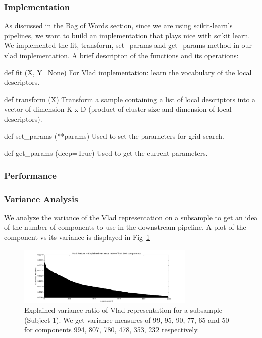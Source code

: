 \documentclass[final,leqno,onefignum,onetabnum]{siamltexmm}
\begin{document}
\subsubsection{Implementation}
As discussed in the Bag of Words section, since we are using scikit-learn's pipelines, we want to build an implementation that plays nice with scikit learn.  We implemented the fit, transform, set\_params and get\_params method in our vlad implementation.  A brief descripton of the functions and its operations:
\begin{description}
  \item{def fit (X, Y=None)}  For Vlad implementation: learn the vocabulary of the local descriptors.
  \item{def transform (X)}  Transform a sample containing a list of local descriptors into a vector of dimension K x D (product of cluster size and dimension of local descriptors).
  \item{def set\_params (**params)} Used to set the parameters for grid search.
  \item{def get\_params (deep=True)} Used to get the current parameters.
\end{description}

\subsubsection{Performance}

\subsubsection{Variance Analysis}
We analyze the variance of the Vlad representation on a subsample to get an idea of the number of components to use in the downstream pipeline.  A plot of the component vs its variance is displayed in Fig~\ref{fig:vlad_variance}
\begin{figure}
  \centering
  \includegraphics[width=0.75\textwidth]{images/vlad_variance}
  \caption{Explained variance ratio of Vlad representation for a subsample (Subject 1).  We get variance measures of 99, 95, 90, 77, 65 and 50 for components 994, 807, 780, 478, 353, 232 respectively.\label{fig:vlad_variance}} 
\end{figure}
\end{document}
